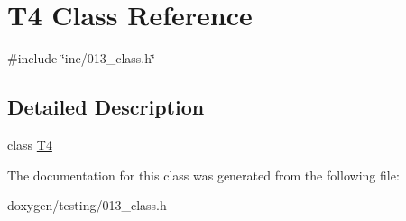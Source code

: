 \hypertarget{class_t4}{}\section{T4 Class Reference}
\label{class_t4}


{\ttfamily \#include \char`\"{}inc/013\+\_\+class.\+h\char`\"{}}



\subsection{Detailed Description}
class \mbox{\hyperlink{class_t4}{T4}} 

The documentation for this class was generated from the following file\+:\begin{DoxyCompactItemize}
\item 
doxygen/testing/013\+\_\+class.\+h\end{DoxyCompactItemize}
